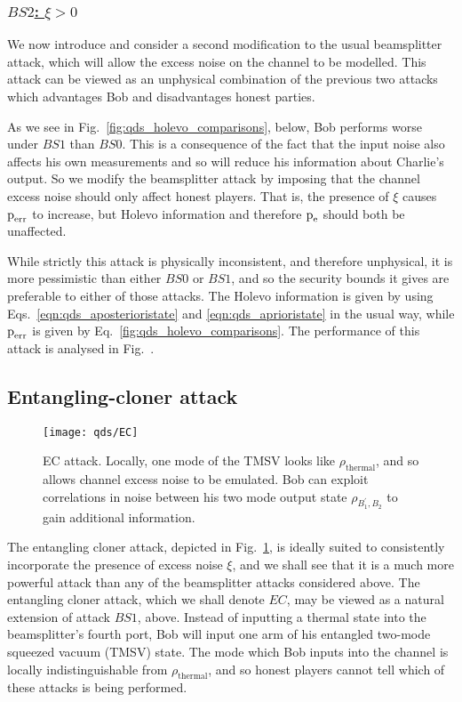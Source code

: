 \subsubsection{\underline{$BS2$: $\xi > 0$}}
We now introduce and consider a second modification to the usual beamsplitter attack, which will allow the excess noise on the channel to be modelled. This attack can be viewed as an unphysical combination of the previous two attacks which advantages Bob and disadvantages honest parties.

As we see in Fig.~\ref{fig:qds_holevo_comparisons}, below, Bob performs worse under $BS1$ than $BS0$. This is a consequence of the fact that the input noise also affects his own measurements and so will reduce his information about Charlie's output. So we modify the beamsplitter attack by imposing that the channel excess noise should only affect honest players. That is, the presence of $\xi$ causes $\text{p}_{\text{err}}$ to increase, but Holevo information and therefore $\text{p}_{\text{e}}$ should both be unaffected. 

While strictly this attack is physically inconsistent, and therefore unphysical, it is more pessimistic than either $BS0$ or $BS1$, and so the security bounds it gives are preferable to either of those attacks. The Holevo information is given by using Eqs.~\ref{eqn:qds_aposterioristate} and \ref{eqn:qds_aprioristate} in the usual way, while $\text{p}_{\text{err}}$ is given by Eq.~\ref{fig:qds_holevo_comparisons}. The performance of this attack is analysed in Fig.~.

\subsection{Entangling-cloner attack}
\begin{figure}[htp]
\centering
\texttt{[image: qds/EC]}
\caption{\label{fig:ec_attack} EC attack. Locally, one mode of the TMSV looks like $\rho_{\text{thermal}}$, and so allows channel excess noise to be emulated. Bob can exploit correlations in noise between his two mode output state $\rho_{B_1^\prime, B_2}$ to gain additional information.}
\end{figure}
The entangling cloner attack, depicted in Fig.~\ref{fig:ec_attack}, is ideally suited to consistently incorporate the presence of excess noise $\xi$, and we shall see that it is a much more powerful attack than any of the beamsplitter attacks considered above. The entangling cloner attack, which we shall denote $EC$, may be viewed as a natural extension of attack $BS1$, above. Instead of inputting a thermal state into the beamsplitter's fourth port, Bob will input one arm of his entangled two-mode squeezed vacuum (TMSV) state. The mode which Bob inputs into the channel is locally indistinguishable from $\rho_{\text{thermal}}$, and so honest players cannot tell which of these attacks is being performed. 

